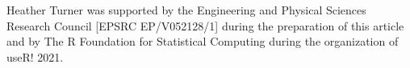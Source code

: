 \documentclass[10pt,letterpaper]{article}
\begin{document}
Heather Turner was supported by the Engineering and Physical Sciences Research Council [EPSRC EP/V052128/1] during the preparation of this article and by The R Foundation for Statistical Computing during the organization of useR! 2021.








\end{document}
